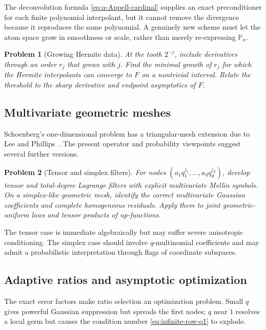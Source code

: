 \documentclass[11pt,a4paper,oneside]{article}
\newtheorem{problem}[problem]{Problem}
\theoremstyle{definition}
\theoremstyle{remark}
\begin{document}
The deconvolution formula \eqref{eq:q-Appell-cardinal} supplies an exact
preconditioner for each finite polynomial interpolant, but it cannot remove
the divergence because it reproduces the same polynomial.  A genuinely new
scheme must let the atom space grow in smoothness or scale, rather than merely
re-expressing $\mathbb P_n$.

\begin{problem}[Growing Hermite data]
\label{prob:growing-hermite}
At the tooth $2^{-j}$, include derivatives through an order $r_j$ that grows
with $j$.  Find the minimal growth of $r_j$ for which the Hermite interpolants
can converge to $F$ on a nontrivial interval.  Relate the threshold to the
sharp derivative and endpoint asymptotics of $F$.
\end{problem}

\subsection{Multivariate geometric meshes}

Schoenberg's one-dimensional problem has a triangular-mesh extension due to
Lee and Phillips~\cite{LeePhillips1988}.  The present operator and probability
viewpoints suggest several further versions.

\begin{problem}[Tensor and simplex filters]
\label{prob:multivariate}
For nodes
$(a_1q_1^{j_1},\ldots,a_dq_d^{j_d})$, develop tensor and total-degree
Lagrange filters with explicit multivariate Mellin symbols.  On a simplex-like
geometric mesh, identify the correct multivariate Gaussian coefficients and
complete homogeneous residuals.  Apply them to joint geometric-uniform laws
and tensor products of up-functions.
\end{problem}

The tensor case is immediate algebraically but may suffer severe anisotropic
conditioning.  The simplex case should involve $q$-multinomial coefficients
and may admit a probabilistic interpretation through flags of coordinate
subspaces.

\subsection{Adaptive ratios and asymptotic optimization}

The exact error factors make ratio selection an optimization problem.  Small
$q$ gives powerful Gaussian suppression but spreads the first nodes; $q$ near
$1$ resolves a local germ but causes the condition number
\eqref{eq:infinite-row-q1} to explode.
\end{document}

